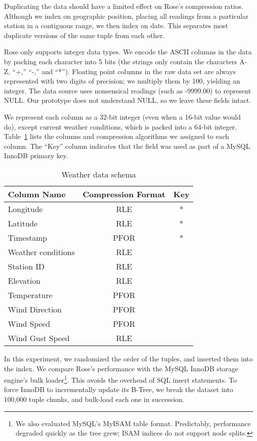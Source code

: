 \documentclass{vldb}
\newcommand{\rows}{Rose\xspace}
\newcommand{\rowss}{Rose's\xspace}
\begin{document}
Duplicating the data should have a limited effect on \rowss
compression ratios.  Although we index on geographic position, placing
all readings from a particular station in a contiguous range, we then
index on date.  This separates most duplicate versions of the same tuple
from each other.

\rows only supports integer data types.  We encode the ASCII columns
in the data by packing each character into 5 bits (the strings only
contain the characters A-Z, ``+,'' ``-,'' and ``*'').  Floating point columns in
the raw data set are always represented with two digits of precision;
we multiply them by 100, yielding an integer.  The data source uses
nonsensical readings (such as -9999.00) to represent NULL.  Our
prototype does not understand NULL, so we leave these fields intact.

We represent each column as a 32-bit integer (even when a 16-bit value
would do), except current weather conditions, which is packed into a
64-bit integer.  Table~\ref{tab:schema} lists the columns and
compression algorithms we assigned to each column.  The ``Key'' column indicates
that the field was used as part of a MySQL InnoDB primary key.

\begin{table}
\caption{Weather data schema}
\centering
\label{tab:schema}
\begin{tabular}{|l|c|c|} \hline
Column Name     & Compression Format &  Key \\ \hline
Longitude       & RLE       & *       \\ \hline
Latitude        & RLE       & *       \\\hline
Timestamp       & PFOR       & *       \\\hline
Weather conditions& RLE       &        \\\hline
Station ID        & RLE       &        \\\hline
Elevation        & RLE       &        \\\hline
Temperature      & PFOR       &        \\\hline
Wind Direction        & PFOR       &        \\\hline
Wind Speed        & PFOR       &        \\\hline
Wind Gust Speed   & RLE       &        \\
\hline\end{tabular}
\end{table}
In this experiment, we randomized the order of the tuples, and inserted them into the index.
We compare \rowss
performance with the MySQL InnoDB storage engine's bulk
loader\footnote{We also evaluated MySQL's MyISAM table format.
  Predictably, performance degraded quickly as the tree grew; ISAM indices do not
  support node splits.}.  This avoids the overhead of SQL insert
statements.  To force InnoDB to incrementally update its B-Tree, we
break the dataset into 100,000 tuple chunks, and bulk-load each one in
succession.
\end{document}
